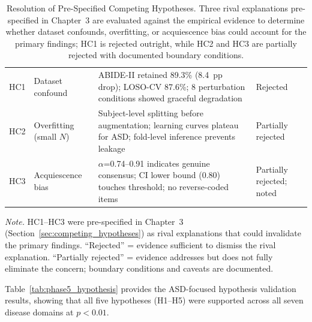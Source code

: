 \begin{table}[!htbp]
\tablestripes\tablefontsize
\tablefontsize
\caption[Competing Hypothesis Resolution]{Resolution of Pre-Specified Competing Hypotheses. Three rival explanations pre-specified in Chapter~3 are evaluated against the empirical evidence to determine whether dataset confounds, overfitting, or acquiescence bias could account for the primary findings; HC1 is rejected outright, while HC2 and HC3 are partially rejected with documented boundary conditions.}
\begin{tabularx}{\textwidth}{@{} >{\raggedright\arraybackslash}p{0.8cm} >{\raggedright\arraybackslash}p{1.4cm} L >{\raggedright\arraybackslash}p{2.8cm} @{}}
\toprule
{} &  &  &  \\
\midrule
HC1 & Dataset confound & ABIDE-II retained 89.3\% (8.4~pp drop); LOSO-CV 87.6\%; 8 perturbation conditions showed graceful degradation & Rejected \\
\addlinespace
HC2 & Overfitting (small $N$) & Subject-level splitting before augmentation; learning curves plateau for ASD; fold-level inference prevents leakage & Partially rejected \\
\addlinespace
HC3 & Acquiescence bias & $\alpha$=0.74--0.91 indicates genuine consensus; CI lower bound (0.80) touches threshold; no reverse-coded items & Partially rejected; noted \\
\bottomrule
\end{tabularx}
\vspace{0.5em}\noindent\textit{Note.} HC1--HC3 were pre-specified in Chapter~3 (Section~\ref{sec:competing_hypotheses}) as rival explanations that could invalidate the primary findings. ``Rejected'' = evidence sufficient to dismiss the rival explanation. ``Partially rejected'' = evidence addresses but does not fully eliminate the concern; boundary conditions and caveats are documented.
\end{table}

Table~\ref{tab:phase5_hypothesis} provides the ASD-focused hypothesis validation results, showing that all five hypotheses (H1--H5) were supported across all seven disease domains at $p < 0.01$.

